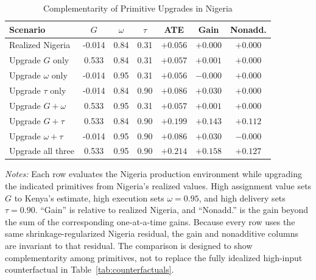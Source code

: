 \begin{table}[H]
\centering
\caption{Complementarity of Primitive Upgrades in Nigeria}
\label{tab:struct_complementarity}
\begin{threeparttable}
\footnotesize
\begin{tabular}[t]{lcccccc}
\toprule
Scenario & $G$ & $\omega$ & $\tau$ & ATE & Gain & Nonadd. \\
\midrule
Realized Nigeria & -0.014 & 0.84 & 0.31 & $+0.056$ & $+0.000$ & $+0.000$ \\
Upgrade $G$ only & 0.533 & 0.84 & 0.31 & $+0.057$ & $+0.001$ & $+0.000$ \\
Upgrade $\omega$ only & -0.014 & 0.95 & 0.31 & $+0.056$ & $-0.000$ & $+0.000$ \\
Upgrade $\tau$ only & -0.014 & 0.84 & 0.90 & $+0.086$ & $+0.030$ & $+0.000$ \\
Upgrade $G+\omega$ & 0.533 & 0.95 & 0.31 & $+0.057$ & $+0.001$ & $+0.000$ \\
Upgrade $G+\tau$ & 0.533 & 0.84 & 0.90 & $+0.199$ & $+0.143$ & $+0.112$ \\
Upgrade $\omega+\tau$ & -0.014 & 0.95 & 0.90 & $+0.086$ & $+0.030$ & $-0.000$ \\
Upgrade all three & 0.533 & 0.95 & 0.90 & $+0.214$ & $+0.158$ & $+0.127$ \\
\bottomrule
\end{tabular}
\begin{tablenotes}
\footnotesize
\item \textit{Notes:} Each row evaluates the Nigeria production environment while upgrading the indicated primitives from Nigeria's realized values. High assignment value sets $G$ to Kenya's estimate, high execution sets $\omega=0.95$, and high delivery sets $\tau=0.90$. ``Gain'' is relative to realized Nigeria, and ``Nonadd.'' is the gain beyond the sum of the corresponding one-at-a-time gains. Because every row uses the same shrinkage-regularized Nigeria residual, the gain and nonadditive columns are invariant to that residual. The comparison is designed to show complementarity among primitives, not to replace the fully idealized high-input counterfactual in Table~\ref{tab:counterfactuals}.
\end{tablenotes}
\end{threeparttable}
\end{table}
